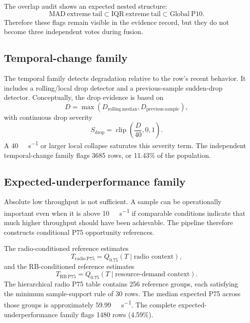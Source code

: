 The overlap audit shows an expected nested structure:
\begin{equation}
\mathrm{MAD\ extreme\ tail}\subset\mathrm{IQR\ extreme\ tail}\subset\mathrm{Global\ P10}.
\end{equation}
Therefore these flags remain visible in the evidence record, but they do not become three independent votes during fusion.

\subsection{Temporal-change family}

The temporal family detects degradation relative to the row's recent behavior. It includes a rolling/local drop detector and a previous-sample sudden-drop detector. Conceptually, the drop evidence is based on
\begin{equation}
D=\max\left(D_{\mathrm{rolling\ median}},D_{\mathrm{previous\ sample}}\right),
\end{equation}
with continuous drop severity
\begin{equation}
S_{\mathrm{drop}}=\operatorname{clip}\left(\frac{D}{40},0,1\right).
\end{equation}
A \SI{40}{\mega\bit\per\second} or larger local collapse saturates this severity term. The independent temporal-change family flags \num{3685} rows, or 11.43\% of the population.

\subsection{Expected-underperformance family}

Absolute low throughput is not sufficient. A sample can be operationally important even when it is above \SI{10}{\mega\bit\per\second} if comparable conditions indicate that much higher throughput should have been achievable. The pipeline therefore constructs conditional P75 opportunity references.

The radio-conditioned reference estimates
\begin{equation}
T_{\mathrm{radio\ P75}} = Q_{0.75}(T\mid \text{radio context}),
\end{equation}
and the RB-conditioned reference estimates
\begin{equation}
T_{\mathrm{RB\ P75}} = Q_{0.75}(T\mid \text{resource-demand context}).
\end{equation}
The hierarchical radio P75 table contains 256 reference groups, each satisfying the minimum sample-support rule of 30 rows. The median expected P75 across those groups is approximately \SI{59.99}{\mega\bit\per\second}. The complete expected-underperformance family flags \num{1480} rows (4.59\%).


